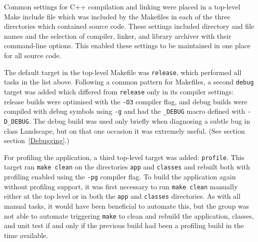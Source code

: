 Common settings for C++ compilation and linking were placed in a top-level Make include file which was included by the Makefiles in each of the three directories which contained source code.  These settings included directory and file names and the selection of compiler, linker, and library archiver with their command-line options.  This enabled these settings to be maintained in one place for all source code.  

The default target in the top-level Makefile was \texttt{release}, which performed all tasks in the list above.  Following a common pattern for Makefiles, a second \texttt{debug} target was added which differed from \texttt{release} only in its compiler settings: release builds were optimised with the \texttt{-O3} compiler flag, and debug builds were compiled with debug symbols using \texttt{-g} and had the \texttt{\_DEBUG} macro defined with \texttt{-D\_DEBUG}.  The debug build was used only briefly when diagnosing a subtle bug in class Landscape, but on that one occasion it was extremely useful.  (See section section~\ref{Debugging}.)

For profiling the application, a third top-level target was added: \texttt{profile}.  This target ran \texttt{make clean} on the directories \texttt{app} and \texttt{classes} and rebuilt both with profiling enabled using the \texttt{-pg} compiler flag.  To build the application again without profiling support, it was first necessary to run \texttt{make clean} manually either at the top level or in both the \texttt{app} and \texttt{classes} directories.  As with all manual tasks, it would have been beneficial to automate this, but the group was not able to automate triggering \texttt{make} to clean and rebuild the application, classes, and unit test if and only if the previous build had been a profiling build in the time available.